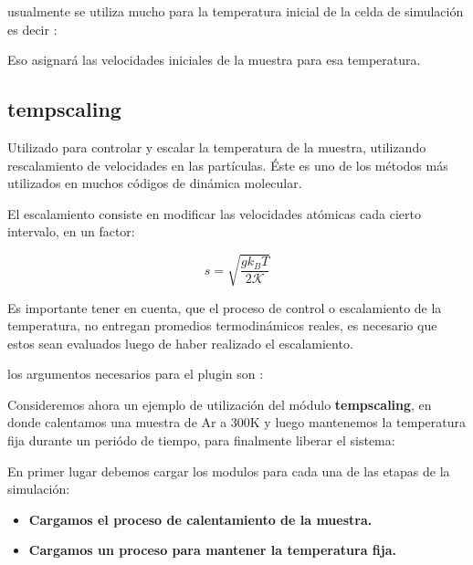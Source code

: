 usualmente se utiliza mucho para la temperatura inicial de la celda de simulaci\'on es decir :


Eso asignar\'a las velocidades iniciales de la muestra para esa temperatura.

\subsection{tempscaling}

Utilizado para controlar y escalar la temperatura de la muestra, utilizando rescalamiento de velocidades en las part\'iculas. \'Este es uno de los m\'etodos m\'as utilizados en muchos c\'odigos de din\'amica molecular.

El escalamiento consiste en modificar las velocidades at\'omicas cada cierto intervalo, en un factor:

$$s=\sqrt{\frac{gk_BT}{2\mathcal{K}}}$$

Es importante tener en cuenta, que el proceso de control o escalamiento de la temperatura, no entregan promedios termodin\'amicos reales, es necesario que estos sean evaluados luego de haber realizado el escalamiento.

los argumentos necesarios para el plugin son :


Consideremos ahora un ejemplo de utilizaci\'on del m\'odulo \textbf{tempscaling}, en donde calentamos una muestra de Ar a 300K y luego mantenemos la temperatura fija durante un peri\'odo de tiempo, para finalmente liberar el sistema:

En primer lugar debemos cargar los modulos para cada una de las etapas de la simulaci\'on:

\begin{itemize}
 \item \textbf{Cargamos el proceso de calentamiento de la muestra.}
 \item \textbf{Cargamos un proceso para mantener la temperatura fija.}
\end{itemize}

